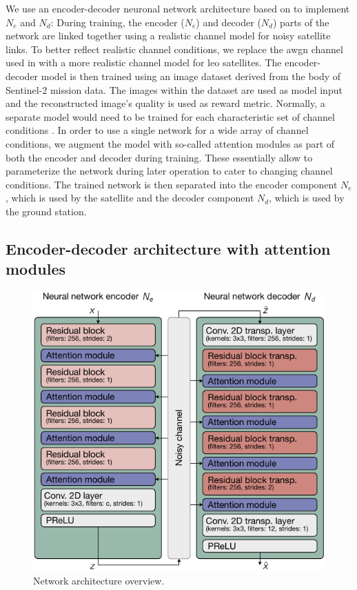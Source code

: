 \documentclass[conference]{IEEEtran}
\newcommand\sentinelii{Sentinel-2\xspace}
\begin{document}
We use an encoder-decoder neuronal network architecture based on \cite{satjscc} to implement $N_e$ and $N_d$:
During training, the encoder ($N_e$) and decoder ($N_d$) parts of the network are linked together using a realistic channel model for noisy satellite links.
To better reflect realistic channel conditions, we replace the \ac{awgn} channel used in \cite{satjscc} with a more realistic channel model for \ac{leo} satellites.
The encoder-decoder model is then trained using an image dataset derived from the body of \sentinelii mission data.
The images within the dataset are used as model input and the reconstructed image's quality is used as reward metric.
Normally, a separate model would need to be trained for each characteristic set of channel conditions \cite{satjscc}.
In order to use a single network for a wide array of channel conditions, we augment the model with so-called attention modules \cite{wireless-attention-modules} as part of both the encoder and decoder during training.
These essentially allow to parameterize the network during later operation to cater to changing channel conditions.
The trained network is then separated into the encoder component $N_e$, which is used by the satellite and the decoder component $N_d$, which is used by the ground station.

\subsection{Encoder-decoder architecture with attention modules}

\begin{figure}
  \includegraphics[width=\linewidth]{figures/network-architecture}

  \caption{Network architecture overview.}
  \label{fig:architecture-overview}
\end{figure}
\end{document}
